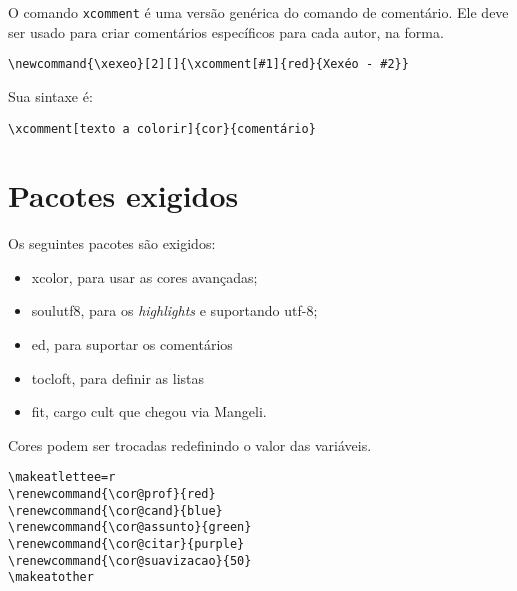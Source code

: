 \documentclass{article}
\begin{document}
O comando \verb!xcomment! é uma versão genérica do comando de comentário. Ele deve ser usado para criar comentários específicos para cada autor, na forma.

\begin{verbatim}
\newcommand{\xexeo}[2][]{\xcomment[#1]{red}{Xexéo - #2}}
\end{verbatim}

Sua sintaxe é:
\begin{verbatim}
\xcomment[texto a colorir]{cor}{comentário}
\end{verbatim}

\section{Pacotes exigidos}

Os seguintes pacotes são exigidos:
\begin{itemize}
    \item xcolor, para usar as cores avançadas;
    \item soulutf8, para os \textit{highlights} e suportando utf-8;
    \item ed, para suportar os comentários
    \item tocloft, para definir as listas 
    \item fit, cargo cult que chegou via Mangeli.
\end{itemize}

Cores podem ser trocadas redefinindo o valor das variáveis.
\begin{verbatim}
\makeatlettee=r
\renewcommand{\cor@prof}{red}
\renewcommand{\cor@cand}{blue}
\renewcommand{\cor@assunto}{green}
\renewcommand{\cor@citar}{purple}
\renewcommand{\cor@suavizacao}{50}
\makeatother
\end{verbatim}



%
%
\printbibliography


\newpage
\listofassunto
\newpage
\listofcomentario
\newpage
\listofcomentarioref
\end{document}
